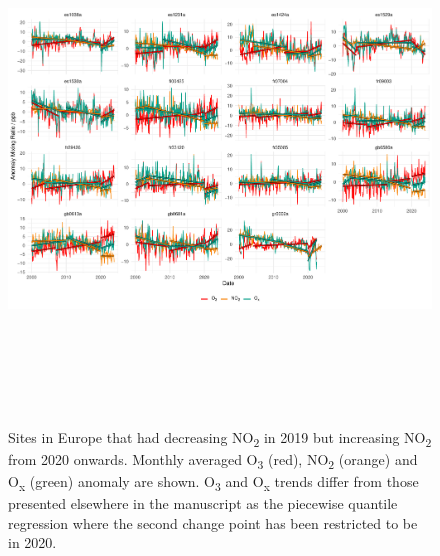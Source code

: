 \documentclass[journal abbreviation, manuscript]{copernicus}
\begin{document}
\begin{figure}
    \includegraphics[height=14cm]{figures/f13_2020_in_europe.pdf}
    \caption{Sites in Europe that had decreasing NO\textsubscript{2} in 2019 but increasing NO\textsubscript{2} from 2020 onwards. Monthly averaged O\textsubscript{3} (red), NO\textsubscript{2} (orange) and O\textsubscript{x} (green) anomaly are shown. O\textsubscript{3} and O\textsubscript{x} trends differ from those presented elsewhere in the manuscript as the piecewise quantile regression where the second change point has been restricted to be in 2020.}
    \label{fig:2020_in_europe}
\end{figure}
\end{document}
